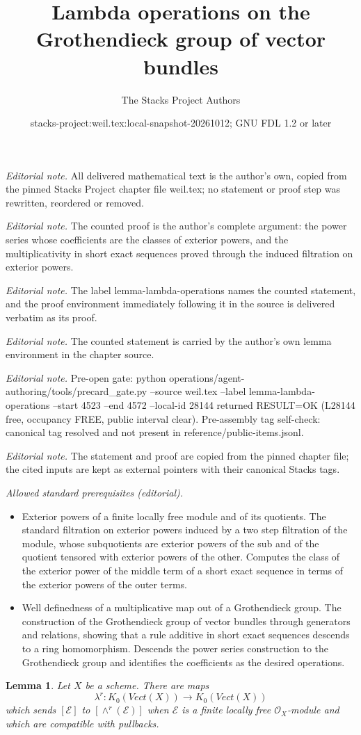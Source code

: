 \documentclass[10pt,a4paper]{amsart}
\title{Lambda operations on the Grothendieck group of vector bundles}
\author{The Stacks Project Authors}
\date{stacks-project:weil.tex:local-snapshot-20261012; GNU FDL 1.2 or later}
\theoremstyle{plain}
\newtheorem{lemma}[subsection]{Lemma}
\theoremstyle{definition}
\theoremstyle{remark}
\numberwithin{equation}{subsection}
\begin{document}
\maketitle
\noindent\textit{Editorial note.} All delivered mathematical text is the author's own, copied from the pinned Stacks Project chapter file weil.tex; no statement or proof step was rewritten, reordered or removed.\par\medskip
\noindent\textit{Editorial note.} The counted proof is the author's complete argument: the power series whose coefficients are the classes of exterior powers, and the multiplicativity in short exact sequences proved through the induced filtration on exterior powers.\par\medskip
\noindent\textit{Editorial note.} The label lemma-lambda-operations names the counted statement, and the proof environment immediately following it in the source is delivered verbatim as its proof.\par\medskip
\noindent\textit{Editorial note.} The counted statement is carried by the author's own lemma environment in the chapter source.\par\medskip
\noindent\textit{Editorial note.} Pre-open gate: python operations/agent-authoring/tools/precard\_gate.py --source weil.tex --label lemma-lambda-operations --start 4523 --end 4572 --local-id 28144 returned RESULT=OK (L28144 free, occupancy FREE, public interval clear). Pre-assembly tag self-check: canonical tag resolved and not present in reference/public-items.jsonl.\par\medskip
\noindent\textit{Editorial note.} The statement and proof are copied from the pinned chapter file; the cited inputs are kept as external pointers with their canonical Stacks tags.\par\medskip
\noindent\textit{Allowed standard prerequisites (editorial).}\begin{itemize}
\item Exterior powers of a finite locally free module and of its quotients. The standard filtration on exterior powers induced by a two step filtration of the module, whose subquotients are exterior powers of the sub and of the quotient tensored with exterior powers of the other. Computes the class of the exterior power of the middle term of a short exact sequence in terms of the exterior powers of the outer terms.
\item Well definedness of a multiplicative map out of a Grothendieck group. The construction of the Grothendieck group of vector bundles through generators and relations, showing that a rule additive in short exact sequences descends to a ring homomorphism. Descends the power series construction to the Grothendieck group and identifies the coefficients as the desired operations.
\end{itemize}\medskip
\begin{lemma}
\label{lemma-lambda-operations}
Let $X$ be a scheme. There are maps
$$
\lambda^r : K_0(\textit{Vect}(X)) \longrightarrow K_0(\textit{Vect}(X))
$$
which sends $[\mathcal{E}]$ to $[\wedge^r(\mathcal{E})]$
when $\mathcal{E}$ is a finite locally free $\mathcal{O}_X$-module
and which are compatible with pullbacks.
\end{lemma}
\end{document}

